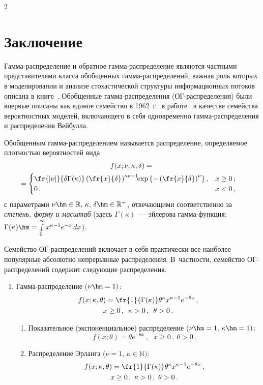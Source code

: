 \begin{multicols}{2}
\section{Заключение}

Гамма-распределение и обратное гамма-рас\-пре\-де\-ле\-ние являются
частными представителями класса обобщенных гам\-ма-рас\-пре\-де\-ле\-ний,
важная роль которых в моделировании и анализе стохастической
структуры информационных потоков описана в книге~\cite{KorolevShorgin2011}. 
Обобщенные гам\-ма-рас\-пре\-де\-ле\-ния
(ОГ-рас\-пре\-де\-ле\-ния) были впервые описаны как единое семейство в
1962~г.\ в работе~\cite{Stacy1962} в качестве семейства
вероятностных моделей, вклю\-ча\-юще\-го в себя одновременно
гам\-ма-рас\-пре\-де\-ле\-ния и распределения Вейбулла.

Обобщенным гамма-рас\-пре\-де\-ле\-ни\-ем называется распределение,
определяемое плот\-ностью вероятностей вида
\begin{multline}
f(x;\nu,\kappa,\delta)={}\\
\hspace*{-4.5mm}{}=
\begin{cases}{
\fr{|\nu|}{\delta\Gamma(\kappa)}\left(\fr{x}{\delta}\right)^{\kappa\nu-1}\!\!\exp
\left\{-\left(\fr{x}{\delta}\right)^{\nu}\right\}}\,,
& x\ge0\,;\\
0\,, & x<0\,,
\end{cases}\label{e16-kor}
\end{multline}
с параметрами $\nu\hm\in\mathbb{R},\,\kappa,\,\delta\hm\in{\mathbb R}^+$, 
отвечающими соответственно за \textit{степень, форму и
масштаб} (здесь $\Gamma(\kappa)$~--- эйлерова гамма-функ\-ция:
$
\Gamma(\kappa)\hm=\int\limits_{0}^{\infty}x^{\kappa-1}e^{-x}\,dx
$).

Семейство ОГ-рас\-пре\-де\-ле\-ний включает в
себя практически все наиболее популярные абсолютно непрерывные
распределения. В~част\-ности, семейство ОГ-рас\-пре\-де\-ле\-ний содержит
следующие распределения.
\begin{enumerate}[1.]
\item Гамма-распределение ($\nu\hm=1)$:
\begin{multline*}
f(x;\kappa,\theta)=\fr{1}{\Gamma(\kappa)}\theta^{\kappa}x^{\kappa-1}e^{-\theta x}\,,\\
x\ge0\,,\enskip \kappa>0\,,\enskip \theta>0\,.
\end{multline*}
\begin{enumerate}[{1}.1]
\item Показательное (экспоненциальное) распределение ($\nu\hm=1,\, \kappa\hm=1)$:
$$
f(x;\theta)=\theta e^{-\theta x}\,,\ \ \ x\ge0\,,\ \theta>0\,.
$$
\item Распределение Эрланга ($\nu=1,\, \kappa\in\mathbb{N})$:
\begin{multline*}
f(x;\kappa,\theta)=\fr{1}{\Gamma(\kappa)}\theta^{\kappa}x^{\kappa-1}e^{-\theta
x}\,,\\ 
x\ge0\,,\ \kappa>0\,,\ \theta>0\,.
\end{multline*}


\end{enumerate}
\end{enumerate}
\end{multicols}
